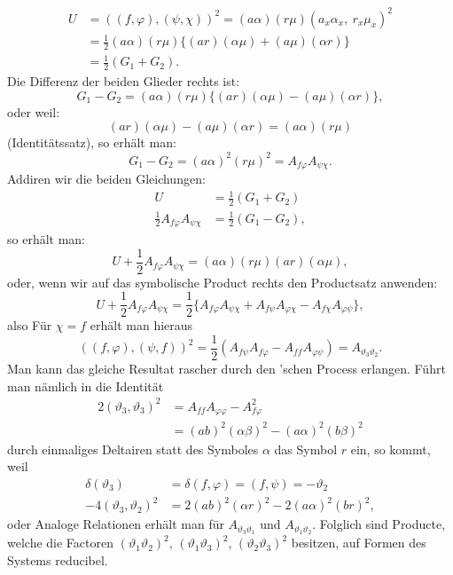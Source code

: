 \[
\begin{aligned}
U &= ((f,\varphi),(\psi,\chi))^2 = (a\alpha)(r\mu)(a_x\alpha_x,\ r_x\mu_x)^2\\
&= \frac{1}{2}(a\alpha)(r\mu)\{(ar)(\alpha\mu)+(a\mu)(\alpha r)\}\\
&= \frac{1}{2}(G_1+G_2).
\end{aligned}
\]
Die Differenz der beiden Glieder rechts ist:
\[
G_1-G_2=(a\alpha)(r\mu)\{(ar)(\alpha\mu)-(a\mu)(\alpha r)\},
\]
oder weil:
\[
(ar)(\alpha\mu)-(a\mu)(\alpha r)=(a\alpha)(r\mu)
\]
(Identit\"atssatz), so erh\"alt man:
\[
G_1-G_2=(a\alpha)^2(r\mu)^2=A_{f\varphi}A_{\psi\chi}.
\]
Addiren wir die beiden Gleichungen:
\[
\begin{aligned}
U &= \frac{1}{2}(G_1+G_2)\\
\frac{1}{2}A_{f\varphi}A_{\psi\chi} &= \frac{1}{2}(G_1-G_2),
\end{aligned}
\]
so erh\"alt man:
\[
U+\frac{1}{2}A_{f\varphi}A_{\psi\chi}=(a\alpha)(r\mu)(ar)(\alpha\mu),
\]
oder, wenn wir auf das symbolische Product rechts den Productsatz anwenden:
\[
U+\frac{1}{2}A_{f\varphi}A_{\psi\chi}=\frac{1}{2}\{A_{f\varphi}A_{\psi\chi}+A_{f\psi}A_{\varphi\chi}-A_{f\chi}A_{\varphi\psi}\},
\]
also
F\"ur $\chi=f$ erh\"alt man hieraus
\[
((f,\varphi),(\psi,f))^2=\frac{1}{2}(A_{f\psi}A_{f\varphi}-A_{ff}A_{\varphi\psi})=A_{\vartheta_3\vartheta_2}.
\]
Man kann das gleiche Resultat rascher durch den 'schen Process erlangen. F\"uhrt man n\"amlich in die Identit\"at
\[
\begin{aligned}
2(\vartheta_3,\vartheta_3)^2 &= A_{ff}A_{\varphi\varphi}-A_{f\varphi}^2\\
&= (ab)^2(\alpha\beta)^2-(a\alpha)^2(b\beta)^2
\end{aligned}
\]
durch einmaliges Deltairen statt des Symboles $\alpha$ das Symbol $r$ ein, so kommt, weil
\[
\begin{aligned}
\delta(\vartheta_3) &= \delta(f,\varphi)=(f,\psi)=-\vartheta_2\\
-4(\vartheta_3,\vartheta_2)^2 &= 2(ab)^2(\alpha r)^2-2(a\alpha)^2(br)^2,
\end{aligned}
\]
oder
Analoge Relationen erh\"alt man f\"ur $A_{\vartheta_3\vartheta_1}$ und $A_{\vartheta_1\vartheta_2}$. Folglich sind Producte, welche die Factoren $(\vartheta_1\vartheta_2)^2$, $(\vartheta_1\vartheta_3)^2$, $(\vartheta_2\vartheta_3)^2$ besitzen, auf Formen des Systems reducibel.


